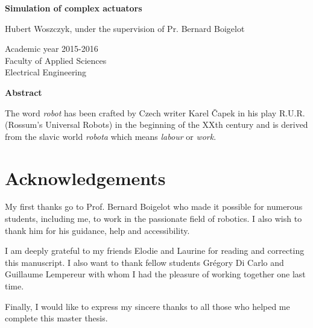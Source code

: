 \thispagestyle{empty}
\begin{center}
    \Large
    \textbf{Simulation of complex actuators}
    
    \vspace{0.4cm}
    \large
    Hubert Woszczyk, under the supervision of Pr. Bernard Boigelot
    
    \normalsize
    Academic year 2015-2016\\
    Faculty of Applied Sciences\\
    Electrical Engineering
    
    \vspace{0.9cm}
    \textbf{Abstract}
\end{center}
The word \emph{robot} has been crafted by Czech writer Karel Čapek in his play R.U.R. (Rossum's Universal Robots) in the beginning of the XXth century and is derived from the slavic world \emph{robota} which means \emph{labour} or \emph{work}.


\clearpage
{}
\setcounter{page}{1}
\chapter*{Acknowledgements}
My first thanks go to Prof. Bernard Boigelot who made it possible for numerous students, including me, to work in the passionate field of robotics. I also wish to thank him for his guidance, help and accessibility.

I am deeply grateful to my friends Elodie and Laurine for reading and correcting this manuscript. I also want to thank fellow students Grégory Di Carlo and Guillaume Lempereur with whom I had the pleasure of working together one last time.

Finally, I would like to express my sincere thanks to all those who helped me complete this master thesis.